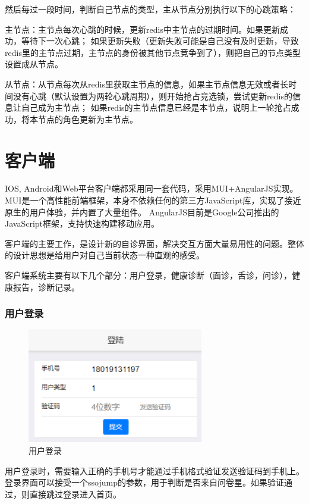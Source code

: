 然后每过一段时间，判断自己节点的类型，主从节点分别执行以下的心跳策略：

主节点：主节点每次心跳的时候，更新redis中主节点的过期时间。如果更新成功，等待下一次心跳； 
如果更新失败（更新失败可能是自己没有及时更新，导致redis里的主节点过期，主节点的身份被其他节点竞争到了），则把自己的节点类型设置成从节点。

从节点：从节点每次从redis里获取主节点的信息，如果主节点信息无效或者长时间没有心跳（默认设置为两轮心跳周期），则开始抢占竞选锁，尝试更新redis的信息让自己成为主节点；
如果redis的主节点信息已经是本节点，说明上一轮抢占成功，将本节点的角色更新为主节点。

\section{客户端}
IOS, Android和Web平台客户端都采用同一套代码，采用MUI+AngularJS实现。
MUI是一个高性能前端框架，本身不依赖任何的第三方JavaScript库，实现了接近原生的用户体验，并内置了大量组件。
AngularJS目前是Google公司推出的JavaScript框架，支持快速构建移动应用。

客户端的主要工作，是设计新的自诊界面，解决交互方面大量易用性的问题。整体的设计思想是给用户对自己当前状态一种直观的感受。

客户端系统主要有以下几个部分：用户登录，健康诊断（面诊，舌诊，问诊），健康报告，诊断记录。

\subsubsection{用户登录}
\begin{figure}[ht]
    \centering
    \includegraphics[height=5cm]{images/login.png}
    \caption{用户登录}
    \label{fig:login}
\end{figure} 
用户登录时，需要输入正确的手机号才能通过手机格式验证发送验证码到手机上。登录界面可以接受一个ssojump的参数，用于判断是否来自问卷星。如果验证通过，则直接跳过登录进入首页。

